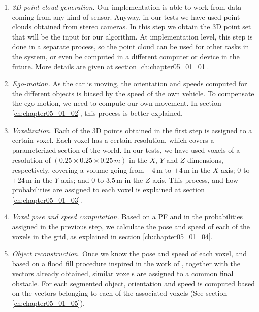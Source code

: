 \begin{enumerate}
 \item \emph{3D point cloud generation.} Our implementation is able to work from data coming from any kind of sensor. Anyway, in our tests we have used point clouds obtained from stereo cameras. In this step we obtain the 3D point set that will be the input for our algorithm. At implementation level, this step is done in a separate process, so the point cloud can be used for other tasks in the system, or even be computed in a different computer or device in the future. More details are given at section \ref{ch:chapter05_01_01}.
 \item \emph{Ego-motion.} As the car is moving, the orientation and speeds computed for the different objects is biased by the speed of the own vehicle. To compensate the ego-motion, we need to compute our own movement. In section \ref{ch:chapter05_01_02}, this process is better explained.
 \item \emph{Voxelization.} Each of the 3D points obtained in the first step is assigned to a certain voxel. Each voxel has a certain resolution, which covers a parameterized section of the world. In our tests, we have used voxels of a resolution of $(0.25\times0.25\times0.25\,m)$ in the $X$, $Y$ and $Z$ dimensions, respectively, covering a volume going from $-4$\,m to $+4$\,m in the $X$ axis; $0$ to $+24$\,m in the $Y$ axis; and $0$ to $3.5$\,m in the $Z$ axis. This process, and how probabilities are assigned to each voxel is explained at section \ref{ch:chapter05_01_03}.
 \item \emph{Voxel pose and speed computation.} Based on a \ac{PF} and in the probabilities assigned in the previous step, we calculate the pose and speed of each of the voxels in the grid, as explained in section \ref{ch:chapter05_01_04}.
 \item \emph{Object reconstruction.} Once we know the pose and speed of each voxel, and based on a flood fill procedure inspired in the work of \cite{broggi2013}, together with the vectors already obtained, similar voxels are assigned to a common final obstacle. For each segmented object, orientation and speed is computed based on the vectors belonging to each of the associated voxels (See section \ref{ch:chapter05_01_05}).
\end{enumerate}

